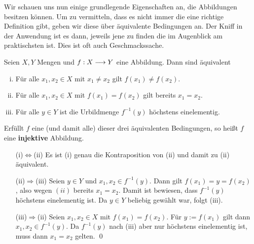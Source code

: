 Wir schauen uns nun einige grundlegende Eigenschaften an, die Abbildungen besitzen können. Um zu vermitteln, dass es nicht immer die eine richtige Definition gibt, geben wir diese über äquivalente Bedingungen an. Der Kniff in der Anwendung ist es dann, jeweils jene zu finden die im Augenblick am praktischsten ist. Dies ist oft auch Geschmackssache.
\begin{de} \label{injektiv}
	Seien $X, Y$ Mengen und $f: X \longrightarrow Y$ eine Abbildung. Dann sind
	äquivalent
	\begin{enumerate}[(i)]
		\item  Für alle $x_{1},x_{2} \in X$ mit $x_1\neq x_2$ gilt $f(x_1)\neq f(x_2)$.
		\item Für alle $x_{1},x_{2}\in X$ mit $f(x_{1})=f(x_{2})$ gilt
		bereits $x_{1}=x_{2}$.
		\item Für alle $y\in Y$ ist die Urbildmenge $f^{-1}(y)$ höchstens
		einelementig.
	\end{enumerate}
Erfüllt $f$ eine (und damit alle) dieser drei äquivalenten Bedingungen, so heißt $f$ eine \textbf{injektive} Abbildung.
\end{de}
\begin{bew}
	\begin{itemize}
		\item[(i)$\Leftrightarrow$(ii)] Es ist (i) genau die Kontraposition von (ii) und damit zu (ii) äquivalent.
		\item[(ii)$\Rightarrow$(iii)] Seien $y\in Y$ und $x_{1},x_{2}\in f^{-1}(y)$. Dann gilt $f(x_{1})
		= y = f(x_{2})$, also wegen $(ii)$ bereits $x_{1}=x_{2}$. Damit ist bewiesen, dass $f^{-1}(y)$ höchstens einelementig ist. Da $y\in Y$ beliebig gewählt war, folgt (iii).
		\item[(iii)$\Rightarrow$(ii)] Seien $x_1,x_2\in X$ mit $f(x_1)=f(x_2)$. Für $y:= f(x_1)$ gilt dann $x_1,x_2\in f^{-1}(y)$. Da $f^{-1}(y)$ nach (iii) aber nur höchstens einelementig ist, muss dann $x_1=x_2$ gelten. \qed
	\end{itemize}
\end{bew}

